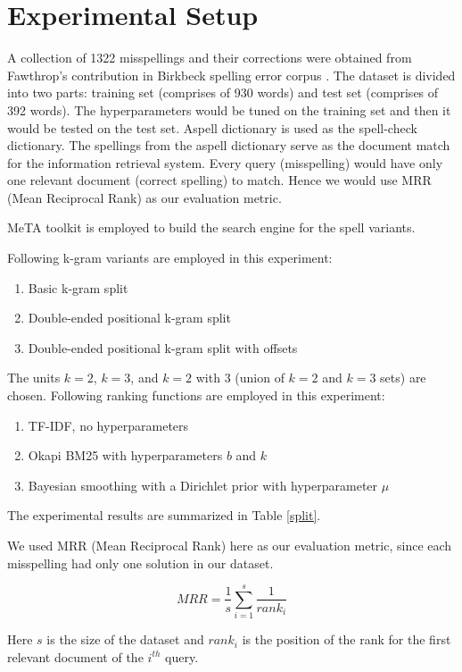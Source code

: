
\chapter{Experimental Setup} %

\label{ch:experim} %


A collection of 1322 misspellings and their corrections were obtained from Fawthrop's contribution in Birkbeck spelling error corpus \cite{mitton1985birkbeck}.
The dataset is divided into two parts: training set (comprises of 930 words) and test set (comprises of 392 words).
The hyperparameters would be tuned on the training set and then it would be tested on the test set.
Aspell dictionary \cite{atkinson2006gnu} is used as the spell-check dictionary. 
The spellings from the aspell dictionary serve as the document match for the information retrieval system.
Every query (misspelling) would have only one relevant document (correct spelling) to match.
Hence we would use MRR (Mean Reciprocal Rank) as our evaluation metric.


MeTA toolkit \cite{massung2016meta} is employed to build the search engine for the spell variants.

Following k-gram variants are employed in this experiment:
\begin{enumerate}
	\item Basic k-gram split
	\item Double-ended positional k-gram split
	\item Double-ended positional k-gram split with offsets
\end{enumerate}
The units $k = 2$, $k = 3$, and $k = 2$ with $3$ (union of $k = 2$ and $k = 3$ sets) are chosen.
Following ranking functions are employed in this experiment:
\begin{enumerate}
	\item TF-IDF, no hyperparameters \cite{tfidf}
	\item Okapi BM25 with hyperparameters $b$ and $k$ \cite{bm25}
	\item Bayesian smoothing with a Dirichlet prior with hyperparameter $\mu$ \cite{dirich}
\end{enumerate}
The experimental results are summarized in Table \ref{split}.

We used MRR (Mean Reciprocal Rank) here as our evaluation metric, since each misspelling had only one solution in our dataset.

\begin{equation*}
	MRR = \frac{1}{s} \sum_{i = 1}^s \frac{1}{rank_i}
\end{equation*}

Here $s$ is the size of the dataset and $rank_i$ is the position of the rank for the first relevant document of the $i^{th}$ query.